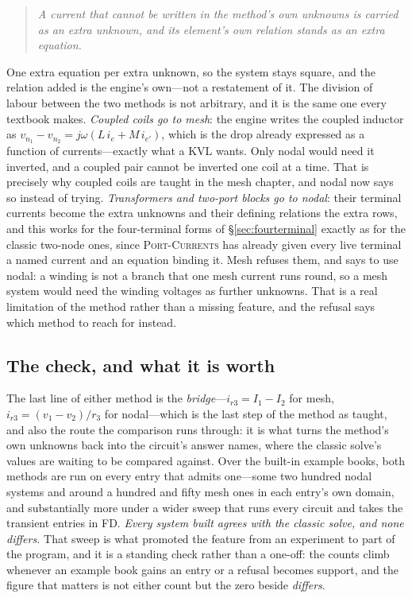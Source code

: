\documentclass[11pt,oneside]{report}
\newcommand{\kw}[1]{\textsc{#1}}
\begin{document}
\begin{quote}
\emph{A current that cannot be written in the method's own unknowns is
carried as an extra unknown, and its element's own relation stands as
an extra equation.}
\end{quote}

\noindent One extra equation per extra unknown, so the system stays
square, and the relation added is the engine's own---not a restatement
of it. The division of labour between the two methods is not
arbitrary, and it is the same one every textbook makes. \emph{Coupled
coils go to mesh}: the engine writes the coupled inductor as
$v_{n_1} - v_{n_2} = j\omega(L\,i_e + M\,i_{e'})$, which is the drop
already expressed as a function of currents---exactly what a KVL
wants. Only nodal would need it inverted, and a coupled pair cannot be
inverted one coil at a time. That is precisely why coupled coils are
taught in the mesh chapter, and nodal now says so instead of trying.
\emph{Transformers and two-port blocks go to nodal}: their terminal
currents become the extra unknowns and their defining relations the
extra rows, and this works for the four-terminal forms of
\S\ref{sec:fourterminal} exactly as for the classic two-node ones,
since \kw{Port-Currents} has already given every live terminal a named
current and an equation binding it. Mesh refuses them, and says to use
nodal: a winding is not a branch that one mesh current runs round, so
a mesh system would need the winding voltages as further unknowns.
That is a real limitation of the method rather than a missing feature,
and the refusal says which method to reach for instead.

\subsection{The check, and what it is worth}

The last line of either method is the \emph{bridge}---$i_{r3} = I_1 -
I_2$ for mesh, $i_{r3} = (v_1 - v_2)/r_3$ for nodal---which is the
last step of the method as taught, and also the route the comparison
runs through: it is what turns the method's own unknowns back into the
circuit's answer names, where the classic solve's values are waiting
to be compared against. Over the built-in example books, both methods
are run on every entry that admits one---some two hundred nodal
systems and around a hundred and fifty mesh ones in each entry's own
domain, and substantially more under a wider sweep that runs every
circuit and takes the transient entries in FD. \emph{Every system built agrees
with the classic solve, and none differs.} That sweep is what promoted
the feature from an experiment to part of the program, and it is a
standing check rather than a one-off: the counts climb whenever an
example book gains an entry or a refusal becomes support, and the
figure that matters is not either count but the zero beside
\emph{differs}.
\end{document}

